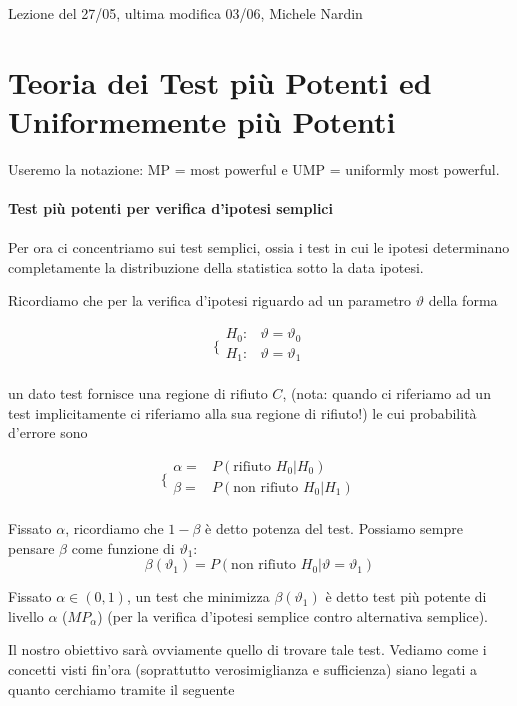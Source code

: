 
Lezione del 27/05, ultima modifica 03/06, Michele Nardin


\section{Teoria dei Test più Potenti ed Uniformemente più Potenti}
Useremo la notazione: MP = most powerful e UMP = uniformly most powerful.\\
\\
\noindent \textbf{Test più potenti per verifica d'ipotesi semplici}\\
\\
Per ora ci concentriamo sui test semplici, ossia i test in cui le ipotesi determinano completamente la distribuzione della statistica sotto la data ipotesi.

Ricordiamo che per la verifica d'ipotesi riguardo ad un parametro $\vartheta$ della forma

$$\bigg \{
\begin{array}{rl}
H_0: & \vartheta = \vartheta_0 \\
H_1: & \vartheta = \vartheta_1 \\
\end{array}
$$

un dato test fornisce una regione di rifiuto $C$, (nota: quando ci riferiamo ad un test implicitamente ci riferiamo alla sua regione di rifiuto!) le cui probabilità d'errore sono

$$\bigg \{
\begin{array}{rl}
\alpha =&  P(\text{rifiuto } H_0 | H_0) \\
\beta =& P(\text{non rifiuto } H_0 | H_1) \\
\end{array}
$$

Fissato $\alpha$, ricordiamo che $1 - \beta$ è detto potenza del test. Possiamo sempre pensare $\beta$ come funzione di $\vartheta_1$:
$$\beta(\vartheta_1) = P(\text{non rifiuto } H_0 | \vartheta = \vartheta_1)$$

\begin{definizione}
 Fissato $\alpha \in (0,1)$, un test che minimizza $\beta(\vartheta_1)$ è detto test più potente di livello $\alpha$ ($MP_\alpha$) \small{(per la verifica d'ipotesi semplice contro alternativa semplice)}. 

\end{definizione}

Il nostro obiettivo sarà ovviamente quello di trovare tale test. Vediamo come i concetti visti fin'ora (soprattutto verosimiglianza e sufficienza) siano legati a quanto cerchiamo tramite il seguente

